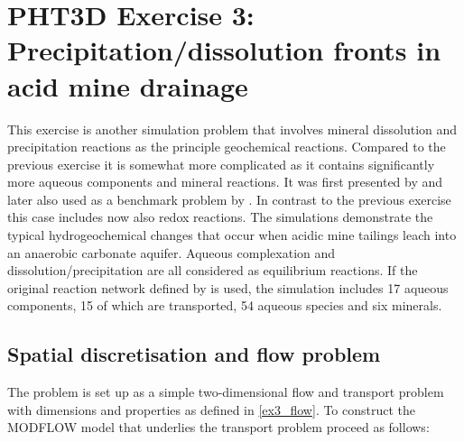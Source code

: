 \section[PHT3D Exercise 3: Precipitation/dissolution fronts in acid mine drainage]{PHT3D Exercise 3: Precipitation/dissolution fronts in acid mine drainage}


This exercise is another simulation problem that involves mineral dissolution and precipitation reactions as the principle geochemical reactions. Compared to the previous 
exercise it is somewhat more complicated as it contains significantly more 
aqueous components and mineral reactions.
It was first presented by \cite{walt94a} and later also used as a benchmark problem by \cite{gmt3d}. In contrast to the previous exercise this case includes now also redox reactions. 
The simulations demonstrate the typical hydrogeochemical changes that occur 
when acidic mine tailings leach into an anaerobic carbonate aquifer. 
Aqueous complexation and dissolution/precipitation are all considered as equilibrium reactions. 
If the original reaction network defined by \cite{walt94a} is used, the simulation 
includes 17 aqueous components, 15 of which are transported, 54 aqueous species and six minerals. 

\subsection[Spatial discretisation and flow problem]{Spatial discretisation and flow problem}

The problem is set up as a simple two-dimensional flow and transport problem with dimensions and properties as defined in \ref{ex3_flow}. To construct the MODFLOW model that underlies the transport problem proceed as follows:




